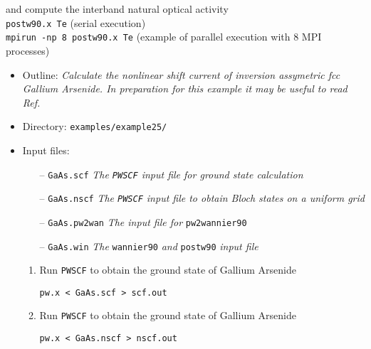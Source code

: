 \documentclass[a4paper,11pt,twoside]{article}
\begin{document}
\begin{enumerate}
and compute the interband natural optical activity\\

  {\tt postw90.x Te} (serial execution)\\
  {\tt mpirun -np 8 postw90.x Te} (example of parallel execution with
  8 MPI processes) \\





\end{enumerate}


\begin{itemize}

\item Outline: \textit{Calculate the nonlinear shift current of inversion assymetric fcc Gallium Arsenide. In preparation for this example it may be useful to read Ref.
\cite{ibanez-azpiroz_ab_2018} }



\item Directory: \verb|examples/example25/|

\item Input files:

\begin{itemize}

\item[--] \verb|GaAs.scf| \textit{The {\tt PWSCF} input file for ground state calculation}
\item[--] \verb|GaAs.nscf| \textit{The {\tt PWSCF} input file to obtain Bloch states on a uniform grid}
\item[--] \verb|GaAs.pw2wan| \textit{The input file for} \verb|pw2wannier90|
\item[--] \verb|GaAs.win| \textit{The} \verb|wannier90| \textit{and} \verb|postw90| \textit{input file}


\end{itemize}


\begin{enumerate}

\item Run {\tt PWSCF} to obtain the ground state of Gallium Arsenide

\verb|pw.x < GaAs.scf > scf.out|


\item Run {\tt PWSCF} to obtain the ground state of Gallium Arsenide

\verb|pw.x < GaAs.nscf > nscf.out|


\end{enumerate}
\end{itemize}
\end{document}

